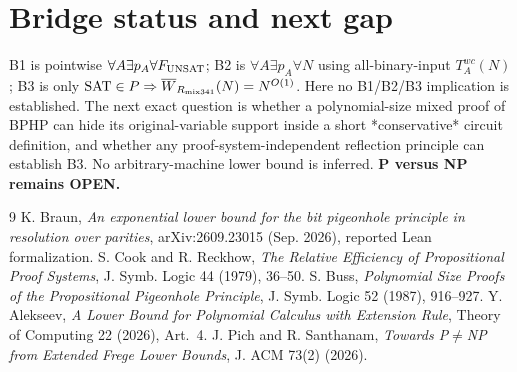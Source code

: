 \documentclass[11pt]{article}
\begin{document}
\section*{Bridge status and next gap}
B1 is pointwise $\forall A\exists p_A\forall F_{\rm UNSAT}$; B2 is $\forall A\exists p_A\forall N$ using all-binary-input $T_A^{wc}(N)$; B3 is only $\mathrm{SAT}\in P\Rightarrow\overline W_{R_{\rm mix341}}(N)=N^{O(1)}$. Here no B1/B2/B3 implication is established. The next exact question is whether a polynomial-size mixed proof of BPHP can hide its original-variable support inside a short *conservative* circuit definition, and whether any proof-system-independent reflection principle can establish B3. No arbitrary-machine lower bound is inferred. \textbf{P versus NP remains OPEN.}

\begin{thebibliography}{9}
 K. Braun, \emph{An exponential lower bound for the bit pigeonhole principle in resolution over parities}, arXiv:2609.23015 (Sep. 2026), reported Lean formalization.
 S. Cook and R. Reckhow, \emph{The Relative Efficiency of Propositional Proof Systems}, J. Symb. Logic 44 (1979), 36--50.
 S. Buss, \emph{Polynomial Size Proofs of the Propositional Pigeonhole Principle}, J. Symb. Logic 52 (1987), 916--927.
 Y. Alekseev, \emph{A Lower Bound for Polynomial Calculus with Extension Rule}, Theory of Computing 22 (2026), Art.~4.
 J. Pich and R. Santhanam, \emph{Towards P$\neq$NP from Extended Frege Lower Bounds}, J. ACM 73(2) (2026).
\end{thebibliography}
\end{document}
